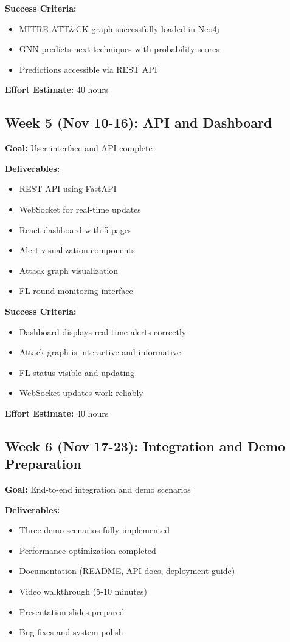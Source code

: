 \documentclass[12pt,a4paper]{article}
\begin{document}
\textbf{Success Criteria:}
\begin{itemize}[leftmargin=1cm,itemsep=0pt]
    \item MITRE ATT\&CK graph successfully loaded in Neo4j
    \item GNN predicts next techniques with probability scores
    \item Predictions accessible via REST API
\end{itemize}

\textbf{Effort Estimate:} 40 hours

\subsection{Week 5 (Nov 10-16): API and Dashboard}

\textbf{Goal:} User interface and API complete

\textbf{Deliverables:}
\begin{itemize}[leftmargin=1cm,itemsep=0pt]
    \item REST API using FastAPI
    \item WebSocket for real-time updates
    \item React dashboard with 5 pages
    \item Alert visualization components
    \item Attack graph visualization
    \item FL round monitoring interface
\end{itemize}

\textbf{Success Criteria:}
\begin{itemize}[leftmargin=1cm,itemsep=0pt]
    \item Dashboard displays real-time alerts correctly
    \item Attack graph is interactive and informative
    \item FL status visible and updating
    \item WebSocket updates work reliably
\end{itemize}

\textbf{Effort Estimate:} 40 hours


\subsection{Week 6 (Nov 17-23): Integration and Demo Preparation}

\textbf{Goal:} End-to-end integration and demo scenarios

\textbf{Deliverables:}
\begin{itemize}[leftmargin=1cm,itemsep=0pt]
    \item Three demo scenarios fully implemented
    \item Performance optimization completed
    \item Documentation (README, API docs, deployment guide)
    \item Video walkthrough (5-10 minutes)
    \item Presentation slides prepared
    \item Bug fixes and system polish
\end{itemize}
\end{document}
